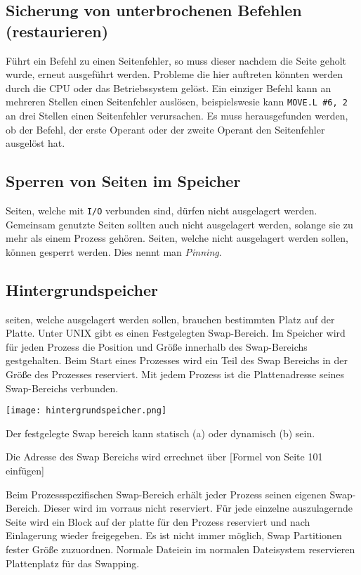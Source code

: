 \subsection{Sicherung von unterbrochenen Befehlen (restaurieren)}

Führt ein Befehl zu einen Seitenfehler, so muss dieser nachdem die Seite geholt
wurde, erneut ausgeführt werden. Probleme die hier auftreten könnten werden
durch die CPU oder das Betriebssystem gelöst. Ein einziger Befehl kann an
mehreren Stellen einen Seitenfehler auslösen, beispielswesie kann
\texttt{MOVE.L \#6, 2} an drei Stellen einen Seitenfehler verursachen. Es muss
herausgefunden werden, ob der Befehl, der erste Operant oder der zweite Operant
den Seitenfehler ausgelöst hat.

\subsection{Sperren von Seiten im Speicher}

Seiten, welche mit \texttt{I/O} verbunden sind, dürfen nicht ausgelagert
werden. Gemeinsam genutzte Seiten sollten auch nicht ausgelagert werden,
solange sie zu mehr als einem Prozess gehören. Seiten, welche nicht ausgelagert
werden sollen, können gesperrt werden. Dies nennt man \textit{Pinning}.

\subsection{Hintergrundspeicher}

seiten, welche ausgelagert werden sollen, brauchen bestimmten Platz auf der
Platte. Unter UNIX gibt es einen Festgelegten Swap-Bereich. Im Speicher wird
für jeden Prozess die Position und Größe innerhalb des Swap-Bereichs
gestgehalten. Beim Start eines Prozesses wird ein Teil des Swap Bereichs in der
Größe des Prozesses reserviert. Mit jedem Prozess ist die Plattenadresse seines
Swap-Bereichs verbunden.

\texttt{[image: hintergrundspeicher.png]}

Der festgelegte Swap bereich kann statisch (a) oder dynamisch (b) sein.

Die Adresse des Swap Bereichs wird errechnet über [Formel von Seite 101
einfügen]

Beim Prozessspezifischen Swap-Bereich erhält jeder Prozess seinen eigenen
Swap-Bereich. Dieser wird im vorraus nicht reserviert. Für jede einzelne
auszulagernde Seite wird ein Block auf der platte für den Prozess reserviert
und nach Einlagerung wieder freigegeben. Es ist nicht immer möglich, Swap
Partitionen fester Größe zuzuordnen. Normale Dateiein im normalen Datei\-system
reservieren Plattenplatz für das Swapping.

